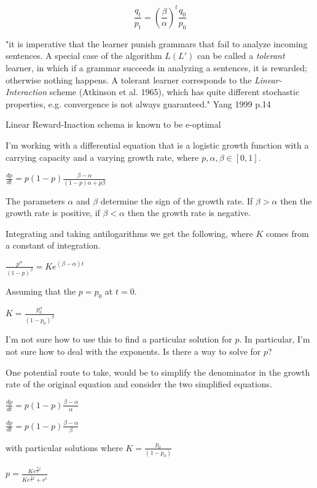 \begin{equation}
     \frac{q_t}{p_t} = \left( \frac{\beta}{\alpha} \right)^t\frac{q_0}{p_0}
\end{equation}

"it is imperative that the learner punish grammars that fail to analyze incoming sentences. A special case of the algorithm $L (L')$ can be called a \emph{tolerant} learner, in which if a grammar succeeds in analyzing a sentences, it is rewarded; otherwise nothing happens. A tolerant learner corresponds to the \emph{Linear-Interaction} scheme (Atkinson et al. 1965), which has quite different stochastic properties, e.g. convergence is not always guaranteed." Yang 1999 p.14

Linear Reward-Inaction schema is known to be e-optimal \citep{narendra2012}

I'm working with a differential equation that is a logistic growth function with a carrying capacity and a varying growth rate, where $p, \alpha, \beta \in [0,1]$.

$\frac{dp}{dt} = p(1-p)\frac{\beta - \alpha}{(1-p)\alpha + p\beta}$

 The parameters $\alpha$ and $\beta$ determine the sign of the growth rate. If $\beta > \alpha$ then the growth rate is positive, if $\beta < \alpha$ then the growth rate is negative.

Integrating and taking antilogarithms we get the following, where $K$ comes from a constant of integration. 
 
 $\frac{p^\alpha}{(1-p)^\beta} = Ke^{(\beta - \alpha)t}$

Assuming that the $p = p_0$ at $t = 0$.

$K = \frac{p_0^\alpha}{(1-p_0)^\beta}$

I'm not sure how to use this to find a particular solution for $p$. In particular, I'm not sure how to deal with the exponents. Is there a way to solve for $p$? 

One potential route to take, would be to simplify the denominator in the growth rate of the original equation and consider the two simplified equations.

$\frac{dp}{dt} = p(1-p)\frac{\beta - \alpha}{\alpha}$

$\frac{dp}{dt} = p(1-p)\frac{\beta - \alpha}{\beta}$

with particular solutions where $K =\frac{p_0}{(1-p_0)}$

$p = \frac{Ke^{\frac{\beta}{\alpha}t}}{Ke^{\frac{\beta}{\alpha}t} + e^t}$

